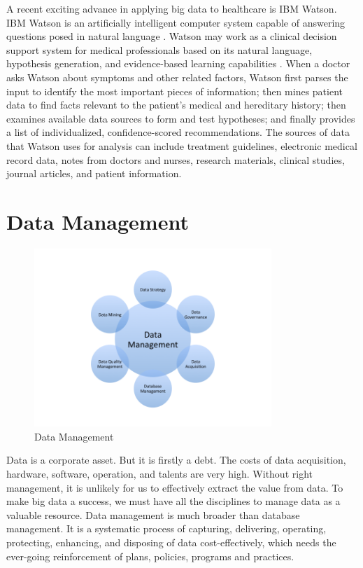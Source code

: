 \documentclass[11pt]{book}
\begin{document}
A recent exciting advance in applying big data to healthcare is IBM Watson. IBM Watson is an artificially intelligent computer system capable of answering questions posed in natural language \cite{Watson2014}.
Watson may work as a clinical decision support system for medical professionals based on its natural language, hypothesis generation, and evidence-based learning capabilities  \cite{Watson2013Healthcare, Watson2013Cancer}. When a doctor asks Watson about symptoms and other related factors, Watson first parses the input to identify the most important pieces of information; then mines patient data to find facts relevant to the patient's medical and hereditary history; then examines available data sources to form and test hypotheses; and finally provides a list of individualized, confidence-scored recommendations. The sources of data that Watson uses for analysis can include treatment guidelines, electronic medical record data, notes from doctors and nurses, research materials, clinical studies, journal articles, and patient information.

\section{Data Management}
\begin{figure}[t]
\includegraphics[width=0.8\textwidth]{images/data-management.png}
\centering
\caption{Data Management}
\end{figure}

Data is a corporate asset. But it is firstly a debt. The costs of data acquisition, hardware, software, operation, and talents are very high. Without right management, it is unlikely for us to effectively extract the value from data. To make big data a success, we must have all the disciplines to manage data as a valuable resource. Data management is much broader than database management. It is a systematic process of capturing, delivering, operating, protecting, enhancing, and disposing of data cost-effectively, which needs the ever-going reinforcement of plans, policies, programs and practices. 
\end{document}
